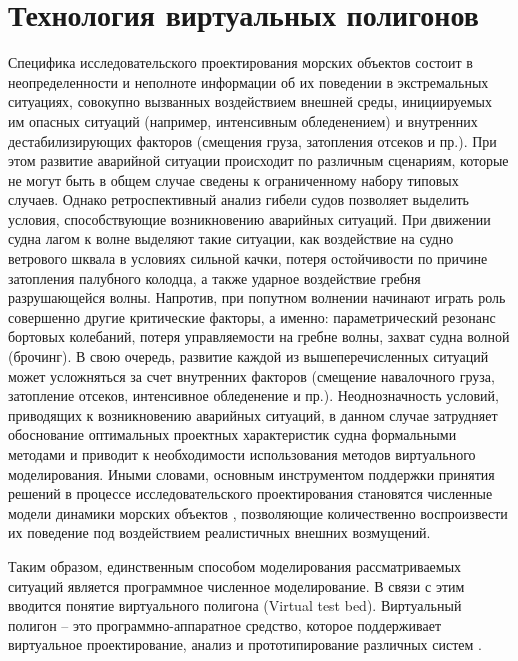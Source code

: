 \section{Технология виртуальных полигонов}
\label{ch1_1_1}

Специфика исследовательского проектирования морских объектов состоит в неопределенности и неполноте информации об их поведении в экстремальных ситуациях, совокупно вызванных воздействием внешней среды, инициируемых им опасных ситуаций (например, интенсивным обледенением) и внутренних дестабилизирующих факторов (смещения груза, затопления отсеков и пр.). При этом развитие аварийной ситуации происходит по различным сценариям, которые не могут быть в общем случае сведены к ограниченному набору типовых случаев. Однако ретроспективный анализ гибели судов позволяет выделить условия, способствующие возникновению аварийных ситуаций. При движении судна лагом к волне выделяют такие ситуации, как воздействие на судно ветрового шквала в условиях сильной качки, потеря остойчивости по причине затопления палубного колодца, а также ударное воздействие гребня разрушающейся волны. Напротив, при попутном волнении начинают играть роль совершенно другие критические факторы, а именно: параметрический резонанс бортовых колебаний, потеря управляемости на гребне волны, захват судна волной (брочинг). В свою очередь, развитие каждой из вышеперечисленных ситуаций может усложняться за счет внутренних факторов (смещение навалочного груза, затопление отсеков, интенсивное обледенение и пр.). Неоднозначность условий, приводящих к возникновению аварийных ситуаций, в данном случае затрудняет обоснование оптимальных проектных характеристик судна формальными методами и приводит к необходимости использования методов виртуального моделирования. Иными словами, основным инструментом поддержки принятия решений в процессе исследовательского проектирования становятся численные модели динамики морских объектов \citep{nechaev_ai}, позволяющие количественно воспроизвести их поведение под воздействием реалистичных внешних возмущений.

Таким образом, единственным способом моделирования рассматриваемых ситуаций является программное численное моделирование. В связи с этим вводится понятие виртуального полигона (Virtual test bed).
Виртуальный полигон – это программно-аппаратное средство, которое поддерживает виртуальное проектирование, анализ и прототипирование различных систем \citep{vtb_ship_ee} \citep{vtb_ILRO}. 

